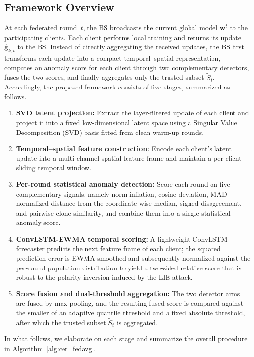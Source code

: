 \documentclass[journal]{IEEEtran}
\begin{document}
\subsection{Framework Overview}

At each federated round~$t$, the BS broadcasts the current global model $\mathbf{w}^t$ to the participating clients. Each client performs local training and returns its update $\hat{\mathbf{g}}_{k,t}$ to the BS. Instead of directly aggregating the received updates, the BS first transforms each update into a compact temporal–spatial representation, computes an anomaly score for each client through two complementary detectors, fuses the two scores, and finally aggregates only the trusted subset $\widetilde{S}_t$. Accordingly, the proposed framework consists of five stages, summarized as follows.
\begin{enumerate}
    \item \textbf{SVD latent projection:} Extract the layer-filtered update of each client and project it into a fixed low-dimensional latent space using a Singular Value Decomposition (SVD) basis fitted from clean warm-up rounds.
    \item \textbf{Temporal–spatial feature construction:} Encode each client's latent update into a multi-channel spatial feature frame and maintain a per-client sliding temporal window.
    \item \textbf{Per-round statistical anomaly detection:} Score each round on five complementary signals, namely norm inflation, cosine deviation, MAD-normalized distance from the coordinate-wise median, signed disagreement, and pairwise clone similarity, and combine them into a single statistical anomaly score.
    \item \textbf{ConvLSTM-EWMA temporal scoring:} A lightweight ConvLSTM forecaster predicts the next feature frame of each client; the squared prediction error is EWMA-smoothed and subsequently normalized against the per-round population distribution to yield a two-sided relative score that is robust to the polarity inversion induced by the LIE attack.
    \item \textbf{Score fusion and dual-threshold aggregation:} The two detector arms are fused by max-pooling, and the resulting fused score is compared against the smaller of an adaptive quantile threshold and a fixed absolute threshold, after which the trusted subset $\widetilde{S}_t$ is aggregated.
\end{enumerate}

In what follows, we elaborate on each stage and summarize the overall procedure in Algorithm~\ref{alg:cer_fedavg}.
\end{document}

